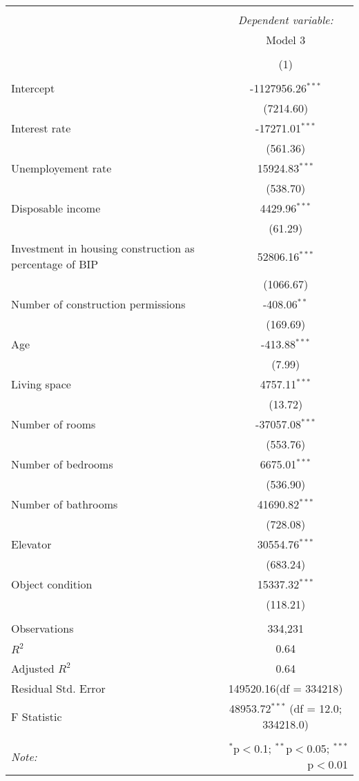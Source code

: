 \begin{table}[!htbp] \centering
\begin{tabular}{@{\extracolsep{5pt}}lc}
\\[-1.8ex]\hline
\hline \\[-1.8ex]
& \multicolumn{1}{c}{\textit{Dependent variable:}} \
\cr \cline{1-2}
\\[-1.8ex] & \multicolumn{1}{c}{Model 3} \\\\[-1.8ex] & (1) \\
\hline \\[-1.8ex]
 Intercept & -1127956.26$^{***}$ \\
  & (7214.60) \\
 Interest rate & -17271.01$^{***}$ \\
  & (561.36) \\
 Unemployement rate & 15924.83$^{***}$ \\
  & (538.70) \\
 Disposable income & 4429.96$^{***}$ \\
  & (61.29) \\
 Investment in housing construction as percentage of BIP & 52806.16$^{***}$ \\
  & (1066.67) \\
 Number of construction permissions & -408.06$^{**}$ \\
  & (169.69) \\
 Age & -413.88$^{***}$ \\
  & (7.99) \\
 Living space & 4757.11$^{***}$ \\
  & (13.72) \\
 Number of rooms & -37057.08$^{***}$ \\
  & (553.76) \\
 Number of bedrooms & 6675.01$^{***}$ \\
  & (536.90) \\
 Number of bathrooms & 41690.82$^{***}$ \\
  & (728.08) \\
 Elevator & 30554.76$^{***}$ \\
  & (683.24) \\
 Object condition & 15337.32$^{***}$ \\
  & (118.21) \\
\hline \\[-1.8ex]
 Observations & 334,231 \\
 $R^2$ & 0.64 \\
 Adjusted $R^2$ & 0.64 \\
 Residual Std. Error & 149520.16(df = 334218)  \\
 F Statistic & 48953.72$^{***}$ (df = 12.0; 334218.0) \\
\hline
\hline \\[-1.8ex]
\textit{Note:} & \multicolumn{1}{r}{$^{*}$p$<$0.1; $^{**}$p$<$0.05; $^{***}$p$<$0.01} \\
\end{tabular}
\end{table}
